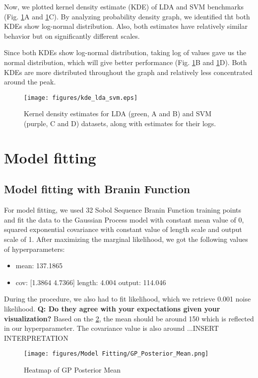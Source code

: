\documentclass[11pt]{article}
\numberwithin{equation}{section}
\begin{document}
Now, we plotted kernel density estimate (KDE) of LDA and SVM benchmarks (Fig.  \ref{fig:kde-lda-svm}A and \ref{fig:kde-lda-svm}C). By analyzing probability density graph, we identified tht both KDEs show log-normal distribution. Also, both estimates have relatively similar behavior but on significantly different scales.

Since both KDEs show log-normal distribution, taking log of values gave us the normal distribution, which will give better performance (Fig. \ref{fig:kde-lda-svm}B and \ref{fig:kde-lda-svm}D). Both KDEs are more distributed throughout the graph and relatively less concentrated around the peak.

\begin{figure}[H]
  \centering
  \texttt{[image: figures/kde\_lda\_svm.eps]}
  \caption{Kernel density estimates for LDA (green, A and B) and SVM (purple, C and D) datasets, along with estimates for their logs.}
  \label{fig:kde-lda-svm}
\end{figure}

\section*{Model fitting}
\subsection*{Model fitting with Branin Function}
For model fitting, we used 32 Sobol Sequence Branin Function training points and fit the data to the Gaussian Process model with constant mean value of 0, squared exponential covariance with constant value of length scale and output scale of 1. After maximizing the marginal likelihood, we got the following values of hyperparameters:
\begin{itemize}
  \item
    mean: 137.1865
  \item
    cov: [1.3864 4.7366]
    length: 4.004
    output: 114.046
\end{itemize}
During the procedure, we also had to fit likelihood, which we retrieve 0.001 noise likelihood.
\textbf{Q: Do they agree with your expectations given your visualization?}
Based on the \ref{fig:gp_post_mean_heatmap}, the mean should be around 150 which is reflected in our hyperparameter. The covariance value is also around ...INSERT INTERPRETATION

\begin{figure}[H]
  \centering
  \texttt{[image: figures/Model Fitting/GP\_Posterior\_Mean.png]}
  \caption{Heatmap of GP Posterior Mean}
  \label{fig:gp_post_mean_heatmap}
\end{figure}
\end{document}
